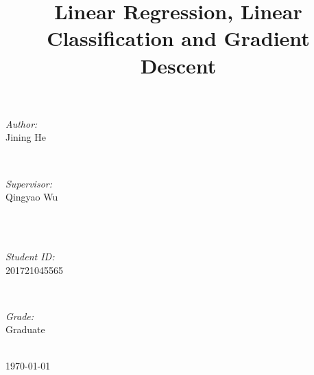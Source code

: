 \documentclass[journal, a4paper]{IEEEtran}
\begin{document}
\begin{titlepage}
\begin{minipage}{0.4\textwidth}
\begin{flushleft} \large
\emph{Author:}\\
Jining He %
\end{flushleft}
\end{minipage}
~
\begin{minipage}{0.4\textwidth}
\begin{flushright} \large
\emph{Supervisor:} \\
Qingyao Wu %
\end{flushright}
\end{minipage}\\[2cm]
~
\begin{minipage}{0.4\textwidth}
\begin{flushleft} \large
\emph{Student ID:}\\
201721045565
\end{flushleft}
\end{minipage}
~
\begin{minipage}{0.4\textwidth}
\begin{flushright} \large
\emph{Grade:} \\
Graduate
\end{flushright}
\end{minipage}\\[2cm]



{\large \today}\\[2cm] %

 

\vfill %

\end{titlepage}

	\title{Linear Regression, Linear Classification and Gradient Descent}
	\maketitle
\end{document}
